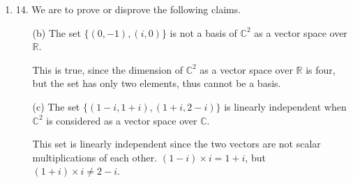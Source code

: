 \documentclass[fleqn]{article}
\newenvironment{answers}{ %
	\begin{enumerate}
		\setlength{\itemsep}{\bigskipamount}
}{\end{enumerate}}
\begin{document}
\begin{answers}
\begin{enumerate}
			\item
				We are to solve the equation \(z^4 = -36\) and calculate the sum of all of its solutions.
				\begin{align*}
					z_1 & = \sqrt{3}(1+i) \\
					    & = \sqrt{6}e^{\frac{\pi i}{4}} = \sqrt{6}\left( \cos\frac{\pi}{4} + i \sin\frac{\pi}{4} \right) = \sqrt{3} + \sqrt{3}i \\
					z_2 & = \sqrt{6}e^{\frac{3\pi i}{4}} = \sqrt{6}\left( \cos\frac{3\pi}{4} + i \sin\frac{3\pi}{4} \right) = - \sqrt{3} + \sqrt{3}i \\
					z_3 & = \sqrt{6}e^{\frac{5\pi i}{4}} = \sqrt{6}\left( \cos\frac{5\pi}{4} + i \sin\frac{5\pi}{4} \right) = - \sqrt{3} - \sqrt{3}i \\
					z_4 & = \sqrt{6}e^{\frac{7\pi i}{4}} = \sqrt{6}\left( \cos\frac{7\pi}{4} + i \sin\frac{7\pi}{4} \right) = \sqrt{3} - \sqrt{3}i
				\end{align*}
				\begin{equation*}
					\sum_{k=1}^4 z_k = 0
				\end{equation*}
		\end{enumerate}

	\item[14.]
		We are to prove or disprove the following claims.
		\begin{enumerate}
			\item[(b)]
				The set \(\{(0, -1), (i, 0)\}\) is not a basis of \(\mathbb{C}^2\) as a vector space over \(\mathbb{R}\).

				This is true, since the dimension of \(\mathbb{C}^2\) as a vector space over \(\mathbb{R}\) is four, but the set has only two elements, thus cannot be a basis.

			\item[(c)]
				The set \(\{(1 - i, 1 + i), (1 + i, 2 - i)\}\) is linearly independent when \(\mathbb{C}^2\) is considered as a vector space over \(\mathbb{C}\).

				This set is linearly independent since the two vectors are not scalar multiplications of each other. \((1-i) \times i = 1+ i\), but \((1+i) \times i \neq 2-i\).
		\end{enumerate}


\end{answers}
\end{document}
